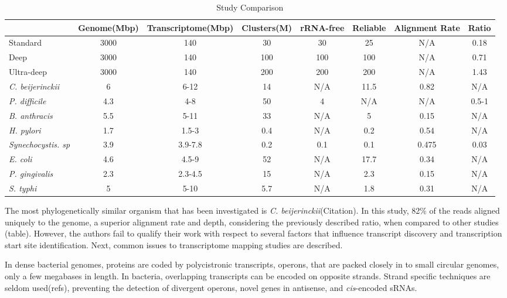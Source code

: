 \begin{table}
\caption{Study Comparison}\label{table:study_compare}
\begin{center}
\begin{tabular}{|l|c|c|c|c|c|c|c|}\hline
 & Genome(Mbp) & Transcriptome(Mbp) & Clusters(M) & rRNA-free & Reliable & Alignment Rate & Ratio\\\hline\hline
Standard & 3000 & 140 & 30 & 30 & 25 & N/A & 0.18\\\hline
Deep & 3000 & 140 & 100 & 100 & 100 & N/A & 0.71\\\hline
Ultra-deep & 3000 & 140 & 200 & 200 & 200 & N/A & 1.43\\\hline
\textit{C. beijerinckii} & 6 & 6-12 & 14 & N/A & 11.5 & 0.82 & N/A\\\hline
\textit{P. difficile} & 4.3 & 4-8 & 50 & 4 & N/A & N/A & 0.5-1\\\hline
\textit{B. anthracis} & 5.5 & 5-11 & 33 & N/A & 5 & 0.15 & N/A\\\hline
\textit{H. pylori} & 1.7 & 1.5-3 & 0.4 & N/A & 0.2 & 0.54 & N/A\\\hline
\textit{Synechocystis. sp} & 3.9 & 3.9-7.8 & 0.2 & 0.1 & 0.1 & 0.475 & 0.03\\\hline
\textit{E. coli} & 4.6 & 4.5-9 & 52 & N/A & 17.7 & 0.34 & N/A\\\hline
\textit{P. gingivalis} & 2.3 & 2.3-4.5 & 15 & N/A & 2.3 & 0.15 & N/A\\\hline
\textit{S. typhi} & 5 & 5-10 & 5.7 & N/A & 1.8 & 0.31 & N/A\\\hline
\end{tabular}
\end{center}
\end{table}


The most phylogenetically similar organism that has been investigated is \textit{C. beijerinckii}(Citation). In this study, 82\% of the reads aligned uniquely to the genome, a superior alignment rate and depth, considering the previously described ratio, when compared to other studies (table). However, the authors fail to qualify their work with respect to several factors that influence transcript discovery and transcription start site identification. Next, common issues to transcriptome mapping studies are described. 

In dense bacterial genomes, proteins are coded by polycistronic transcripts, operons, that are packed closely in to small circular genomes, only a few megabases in length. In bacteria, overlapping transcripts can be encoded on opposite strands. Strand specific techniques are seldom used(refs), preventing the detection of divergent operons, novel genes in antisense, and \textit{cis}-encoded sRNAs.

